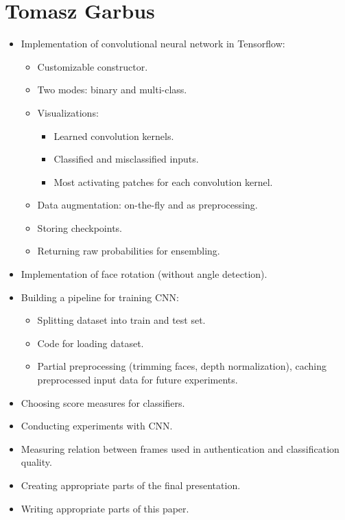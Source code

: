     \section{Tomasz Garbus}
        \begin{itemize}
            \item Implementation of convolutional neural network in Tensorflow:
            \begin{itemize}
                \item Customizable constructor.
                \item Two modes: binary and multi-class.
                \item Visualizations:
                    \begin{itemize}
                        \item Learned convolution kernels.
                        \item Classified and misclassified inputs.
                        \item Most activating patches for each convolution kernel.
                    \end{itemize}
                \item Data augmentation: on-the-fly and as preprocessing.
                \item Storing checkpoints.
                \item Returning raw probabilities for ensembling.
            \end{itemize}
            \item Implementation of face rotation (without angle detection).
            \item Building a pipeline for training CNN:
            \begin{itemize}
                \item Splitting dataset into train and test set.
                \item Code for loading dataset.
                \item Partial preprocessing (trimming faces, depth normalization),
                      caching preprocessed input data for future experiments.
            \end{itemize}
            \item Choosing score measures for classifiers.
            \item Conducting experiments with CNN.
            \item Measuring relation between frames used in authentication and
                  classification quality.
            \item Creating appropriate parts of the final presentation.
            \item Writing appropriate parts of this paper.
        \end{itemize}

